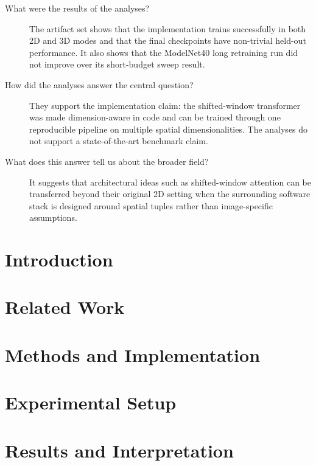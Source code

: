 \documentclass[a4paper,oneside,10pt,english]{scrartcl}
\begin{document}
\begin{description}
  \item[What were the results of the analyses?]
  The artifact set shows that the implementation trains successfully in both 2D and 3D modes and that the final checkpoints have non-trivial held-out performance. It also shows that the ModelNet40 long retraining run did not improve over its short-budget sweep result.

  \item[How did the analyses answer the central question?]
  They support the implementation claim: the shifted-window transformer was made dimension-aware in code and can be trained through one reproducible pipeline on multiple spatial dimensionalities. The analyses do not support a state-of-the-art benchmark claim.

  \item[What does this answer tell us about the broader field?]
  It suggests that architectural ideas such as shifted-window attention can be transferred beyond their original 2D setting when the surrounding software stack is designed around spatial tuples rather than image-specific assumptions.

\end{description}

\cleardoubleoddpage
\section{Introduction}
\label{sec:introduction}


\section{Related Work}
\label{sec:related-work}


\section{Methods and Implementation}
\label{sec:methods}


\section{Experimental Setup}
\label{sec:setup}


\section{Results and Interpretation}
\label{sec:results}

\end{document}
